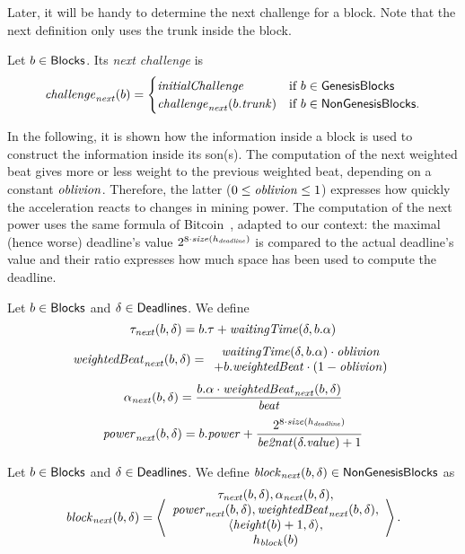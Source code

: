 Later, it will be handy to determine the next challenge for a block. Note that
the next definition only uses the trunk inside the block.
%
\begin{definition}\label{def:next_challenge_from_block}
  Let $b\in{\mathsf{Blocks}}$. Its \emph{next challenge} is
  \[
  {\mathit{challenge}}_{\mathit{next}}(b)=\begin{cases}
  {\mathit{initialChallenge}} & \text{if $b\in{\mathsf{GenesisBlocks}}$}\\
  {\mathit{challenge}}_{\mathit{next}}(b.{\mathit{trunk}}) & \text{if $b\in{\mathsf{NonGenesisBlocks}}$.}
  \end{cases}
  \]
\end{definition}

In the following, it is shown how the information inside a block is used to construct
the information inside its son(s). The computation of the next weighted beat
gives more or less weight to the previous weighted beat, depending on a constant ${\mathit{oblivion}}$.
Therefore, the latter ($0\le{\mathit{oblivion}}\le 1$) expresses how quickly the acceleration reacts to changes
in mining power. The computation of the next power uses the same formula of Bitcoin~\cite{WalkerG24},
adapted to our context: the maximal (hence worse) deadline's value $2^{8\cdot{\mathit{size}}(h_{\mathit{deadline}})}$ is compared
to the actual deadline's value and their ratio expresses how much space has been used to compute the deadline.
%
\begin{definition}\label{def:next}
  Let $b\in{\mathsf{Blocks}}$ and $\delta\in{\mathsf{Deadlines}}$. We define
  \[
  \tau_{\mathit{next}}(b,\delta)=b.\tau+{\mathit{waitingTime}}(\delta,b.\alpha)
  \]
  \[
  \mathit{weightedBeat}_{\mathit{next}}(b,\delta)=\begin{array}{c}
  {\mathit{waitingTime}}(\delta,b.\alpha)\cdot{\mathit{oblivion}}\\
  +b.\mathit{weightedBeat}\cdot(1-{\mathit{oblivion}})
  \end{array}
  \]
  \[
  \alpha_{\mathit{next}}(b,\delta)=\frac{b.\alpha\cdot\mathit{weightedBeat}_{\mathit{next}}(b,\delta)}{{\mathit{beat}}}
  \]
  \[
  {\mathit{power}}_{\mathit{next}}(b,\delta)=b.{\mathit{power}}+\frac{2^{8\cdot{\mathit{size}}(h_{\mathit{deadline}})}}{{\mathit{be2nat}}(\delta.\mathit{value})+1}
  \]
\end{definition}
%
\begin{definition}\label{def:next_block}
  Let $b\in{\mathsf{Blocks}}$ and $\delta\in{\mathsf{Deadlines}}$. We define
  ${\mathit{block}}_{\mathit{next}}(b,\delta)\in{\mathsf{NonGenesisBlocks}}$ as
  \[
  {\mathit{block}}_{\mathit{next}}(b,\delta)=\left\langle\begin{array}{c}
  \tau_{\mathit{next}}(b,\delta),\alpha_{\mathit{next}}(b,\delta),\\
  {\mathit{power}}_{\mathit{next}}(b,\delta),\mathit{weightedBeat}_{\mathit{next}}(b,\delta),\\
  \langle{\mathit{height}}(b)+1,\delta\rangle,\\
  h_{\mathit{block}}(b)
  \end{array}\right\rangle.
  \]
\end{definition}
